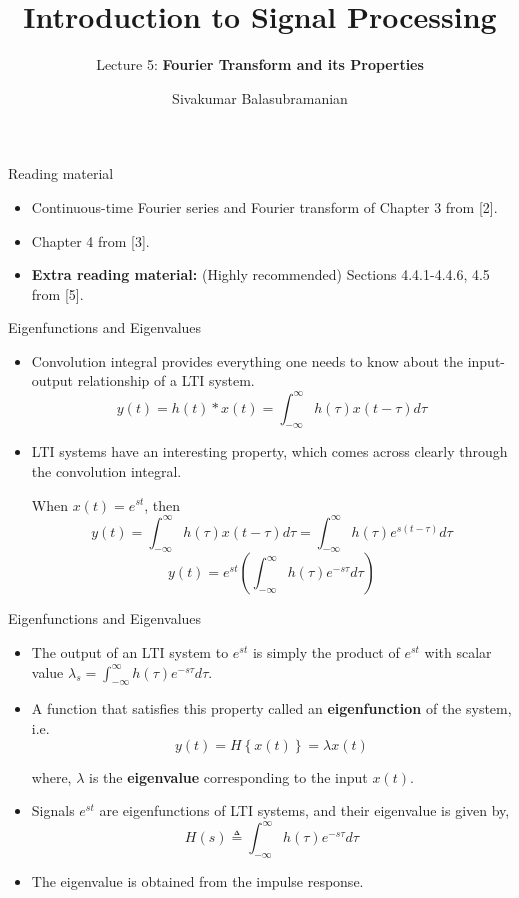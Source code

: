 \documentclass{beamer}
\title{Introduction to Signal Processing}
\subtitle{Lecture 5: \textbf{Fourier Transform and its Properties}}
\author{Sivakumar Balasubramanian}
\institute[Christian Medical College] %
{
  \inst{}%
  Department of Bioengineering\\
  Christian Medical College, Bagayam\\
  Vellore 632002
}
\date{}
\begin{document}
\begin{frame}
  \titlepage
\end{frame}

\begin{frame}{Reading material}

\begin{itemize}
\item Continuous-time Fourier series and Fourier transform of Chapter 3 from [2].
\item Chapter 4 from [3].
\item \textbf{Extra reading material:} (Highly recommended) Sections 4.4.1-4.4.6, 4.5 from [5]. 
\end{itemize}

\end{frame}


\begin{frame}{Eigenfunctions and Eigenvalues}

\begin{itemize}
\item Convolution integral provides everything one needs to know about the input-output relationship of a LTI system.
\[ y(t) = h(t) * x(t) = \int_{-\infty}^{\infty}h(\tau)x(t - \tau)d\tau \]
\item LTI systems have an interesting property, which comes across clearly through the convolution integral.
\vspace{2mm}

When $x(t) = e^{st}$, then
\[ y(t) = \int_{-\infty}^{\infty}h(\tau)x(t - \tau)d\tau = \int_{-\infty}^{\infty}h(\tau)e^{s(t - \tau)}d\tau \]
\[ y(t) = e^{st}\left(\int_{-\infty}^{\infty}h(\tau)e^{-s\tau}d\tau\right) \]
\end{itemize}

\end{frame}

\begin{frame}{Eigenfunctions and Eigenvalues}

\begin{itemize}
\item The output of an LTI system to $e^{st}$ is simply the product of $e^{st}$ with scalar value $\lambda_s = \int_{-\infty}^{\infty}h(\tau)e^{-s\tau}d\tau$.

\item A function that satisfies this property called an \textbf{eigenfunction} of the system, i.e.
\[ y(t) = H\left\{x(t)\right\} = \lambda x\left(t\right) \]

where, $\lambda$ is the \textbf{eigenvalue} corresponding to the input $x(t)$.
\item Signals $e^{st}$ are eigenfunctions of LTI systems, and their eigenvalue is given by,
\[ H(s) \triangleq \int_{-\infty}^{\infty}h(\tau)e^{-s\tau}d\tau \]
\item The eigenvalue is obtained from the impulse response.
\end{itemize}
\end{frame}
\end{document}
